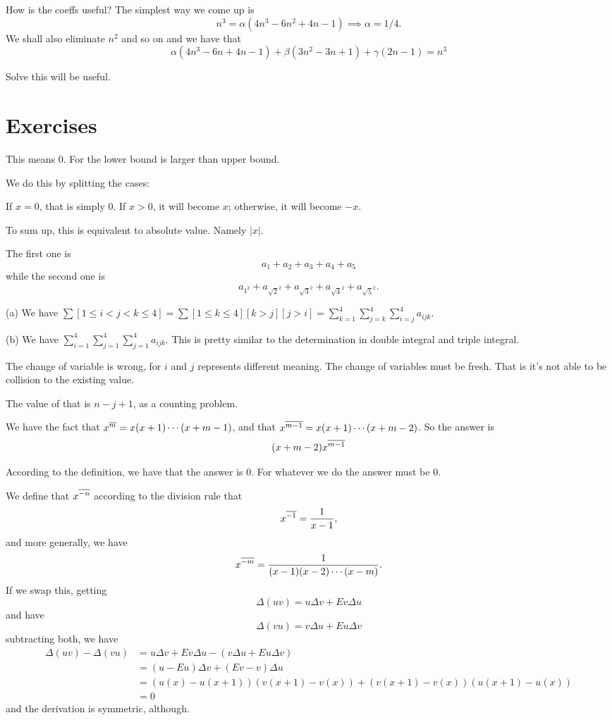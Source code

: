 How is the coeffs useful? The simplest way we come up is 
\[
    n^3=\alpha \left( 4n^3-6n^2+4n-1 \right) \implies \alpha=1/4.
\]
We shall also eliminate $n^2$ and so on and we have that
\[ 
    \alpha(4n^3-6n+4n-1)+\beta(3n^2-3n+1)+\gamma(2n-1)=n^3
\]

Solve this will be useful. 


\section{Exercises}

 This means $0$. For the lower bound is larger than upper bound.

 We do this by splitting the cases: 

If $x=0$, that is simply 0. If $x>0$, it will become $x$; otherwise, it 
will become $-x$. 

To sum up, this is equivalent to absolute value. Namely $|x|$. 

 The first one is 
\[
    a_1 + a_2+a_3+a_4+a_5
\]
while the second one is
\[
    a_{1^2}+a_{\sqrt{2}^2}+a_{\sqrt{3}^2}+a_{\sqrt{4}^2}+a_{\sqrt{5}^2}. 
\]

 (a) We have $\sum[1\leq i<j<k\leq 4]=\sum[1\leq k\leq 4][k>j][j>i]=\sum_{k=1}^{4}\sum_{j=k}^{4}\sum_{i=j}^{4} a_{ijk}$. 

(b) We have $\sum_{i=1}^{4} \sum_{j=1}^{4} \sum_{j=1}^{4} a_{ijk}.$ This 
is pretty similar to the determination in double integral and triple 
integral. 

 The change of variable is wrong, for $i$ and $j$ represents 
different meaning. The change of variables must be fresh. That is it's 
not able to be collision to the existing value. 

 The value of that is $n-j+1$, as a counting problem. 

 We have the fact that $x^{\overline{m}} = x(x+1)\cdots (x+m-1)$, and that 
$x^{\overline{m-1}} = x(x+1)\cdots (x+m-2)$. So the answer is 
\[
    (x+m-2) x^{\overline{m-1}}
\]

 According to the definition, we have that the answer is 0. 
For whatever we do the answer must be 0. 

 We define that $x^{\overline{-n}}$ according to the division rule that 
\[
    x^{\overline{-1}} = {1\over x-1}, 
\]
and more generally, we have 
\[
    x^{\overline{-m}} = {1\over (x-1)(x-2)\cdots (x-m)}.  
\]
 If we swap this, getting 
\[
    \Delta (uv) = u\Delta v + Ev\Delta u
\]
and have 
\[
    \Delta (vu) = v\Delta u + Eu\Delta v
\]
subtracting both, we have 
\begin{align*}
    \Delta (uv)-\Delta (vu) &= u\Delta v +Ev\Delta u - (v\Delta u + Eu\Delta v) \\
                            &= (u-Eu)\Delta v +(Ev - v)\Delta u\\
                            &= (u(x)-u(x+1))(v(x+1)-v(x))+(v(x+1)-v(x))
                            (u(x+1)-u(x))\\
                            &= 0
\end{align*}
and the derivation is symmetric, although. 


